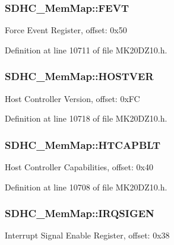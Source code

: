 \subsubsection[{\texorpdfstring{F\+E\+VT}{FEVT}}]{ S\+D\+H\+C\+\_\+\+Mem\+Map\+::\+F\+E\+VT}\hypertarget{struct_s_d_h_c___mem_map_a6a098ed78e71b25e706ddcc64960aae7}{}\label{struct_s_d_h_c___mem_map_a6a098ed78e71b25e706ddcc64960aae7}
Force Event Register, offset\+: 0x50 

Definition at line 10711 of file M\+K20\+D\+Z10.\+h.

\subsubsection[{\texorpdfstring{H\+O\+S\+T\+V\+ER}{HOSTVER}}]{ S\+D\+H\+C\+\_\+\+Mem\+Map\+::\+H\+O\+S\+T\+V\+ER}\hypertarget{struct_s_d_h_c___mem_map_a27ec00dc3be305a561fae9978fe799a2}{}\label{struct_s_d_h_c___mem_map_a27ec00dc3be305a561fae9978fe799a2}
Host Controller Version, offset\+: 0x\+FC 

Definition at line 10718 of file M\+K20\+D\+Z10.\+h.

\subsubsection[{\texorpdfstring{H\+T\+C\+A\+P\+B\+LT}{HTCAPBLT}}]{ S\+D\+H\+C\+\_\+\+Mem\+Map\+::\+H\+T\+C\+A\+P\+B\+LT}\hypertarget{struct_s_d_h_c___mem_map_ae8e1450bf44904b339a9d799f54f2847}{}\label{struct_s_d_h_c___mem_map_ae8e1450bf44904b339a9d799f54f2847}
Host Controller Capabilities, offset\+: 0x40 

Definition at line 10708 of file M\+K20\+D\+Z10.\+h.

\subsubsection[{\texorpdfstring{I\+R\+Q\+S\+I\+G\+EN}{IRQSIGEN}}]{ S\+D\+H\+C\+\_\+\+Mem\+Map\+::\+I\+R\+Q\+S\+I\+G\+EN}\hypertarget{struct_s_d_h_c___mem_map_a21516e4f38134a06a1f1dc718676e72e}{}\label{struct_s_d_h_c___mem_map_a21516e4f38134a06a1f1dc718676e72e}
Interrupt Signal Enable Register, offset\+: 0x38 

